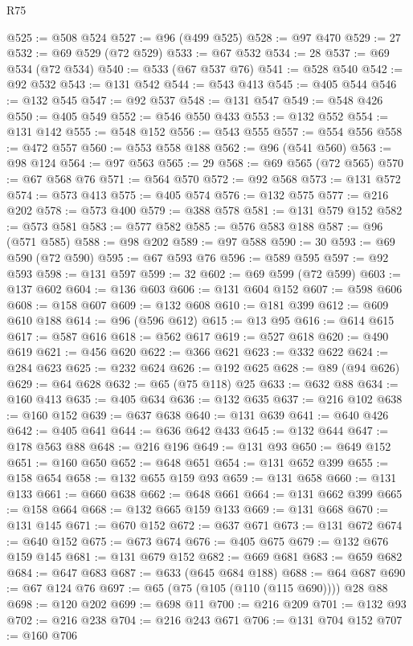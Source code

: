 \begin{lexlean}{R75}
\begin{coremodule}
@525 := @508 @524
@527 := @96 (@499 @525)
@528 := @97 @470
@529 := 27
@532 := @69 @529 (@72 @529)
@533 := @67 @532
@534 := 28
@537 := @69 @534 (@72 @534)
@540 := @533 (@67 @537 @76)
@541 := @528 @540
@542 := @92 @532
@543 := @131 @542
@544 := @543 @413
@545 := @405 @544
@546 := @132 @545
@547 := @92 @537
@548 := @131 @547
@549 := @548 @426
@550 := @405 @549
@552 := @546 @550 @433
@553 := @132 @552
@554 := @131 @142
@555 := @548 @152
@556 := @543 @555
@557 := @554 @556
@558 := @472 @557
@560 := @553 @558 @188
@562 := @96 (@541 @560)
@563 := @98 @124
@564 := @97 @563
@565 := 29
@568 := @69 @565 (@72 @565)
@570 := @67 @568 @76
@571 := @564 @570
@572 := @92 @568
@573 := @131 @572
@574 := @573 @413
@575 := @405 @574
@576 := @132 @575
@577 := @216 @202
@578 := @573 @400
@579 := @388 @578
@581 := @131 @579 @152
@582 := @573 @581
@583 := @577 @582
@585 := @576 @583 @188
@587 := @96 (@571 @585)
@588 := @98 @202
@589 := @97 @588
@590 := 30
@593 := @69 @590 (@72 @590)
@595 := @67 @593 @76
@596 := @589 @595
@597 := @92 @593
@598 := @131 @597
@599 := 32
@602 := @69 @599 (@72 @599)
@603 := @137 @602
@604 := @136 @603
@606 := @131 @604 @152
@607 := @598 @606
@608 := @158 @607
@609 := @132 @608
@610 := @181 @399
@612 := @609 @610 @188
@614 := @96 (@596 @612)
@615 := @13 @95
@616 := @614 @615
@617 := @587 @616
@618 := @562 @617
@619 := @527 @618
@620 := @490 @619
@621 := @456 @620
@622 := @366 @621
@623 := @332 @622
@624 := @284 @623
@625 := @232 @624
@626 := @192 @625
@628 := @89 (@94 @626)
@629 := @64 @628
@632 := @65 (@75 @118) @25
@633 := @632 @88
@634 := @160 @413
@635 := @405 @634
@636 := @132 @635
@637 := @216 @102
@638 := @160 @152
@639 := @637 @638
@640 := @131 @639
@641 := @640 @426
@642 := @405 @641
@644 := @636 @642 @433
@645 := @132 @644
@647 := @178 @563 @88
@648 := @216 @196
@649 := @131 @93
@650 := @649 @152
@651 := @160 @650
@652 := @648 @651
@654 := @131 @652 @399
@655 := @158 @654
@658 := @132 @655 @159 @93
@659 := @131 @658
@660 := @131 @133
@661 := @660 @638
@662 := @648 @661
@664 := @131 @662 @399
@665 := @158 @664
@668 := @132 @665 @159 @133
@669 := @131 @668
@670 := @131 @145
@671 := @670 @152
@672 := @637 @671
@673 := @131 @672
@674 := @640 @152
@675 := @673 @674
@676 := @405 @675
@679 := @132 @676 @159 @145
@681 := @131 @679 @152
@682 := @669 @681
@683 := @659 @682
@684 := @647 @683
@687 := @633 (@645 @684 @188)
@688 := @64 @687
@690 := @67 @124 @76
@697 := @65 (@75 (@105 (@110 (@115 @690)))) @28 @88
@698 := @120 @202
@699 := @698 @11
@700 := @216 @209
@701 := @132 @93
@702 := @216 @238
@704 := @216 @243 @671
@706 := @131 @704 @152
@707 := @160 @706

\end{coremodule}
\end{lexlean}

